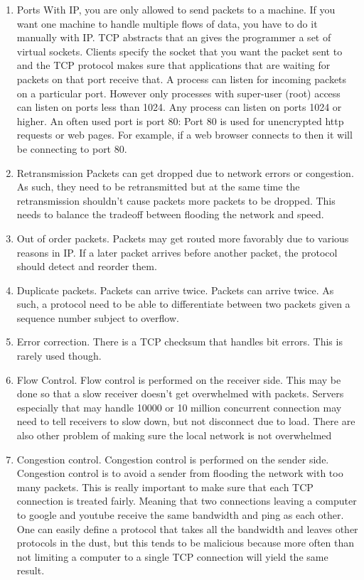 \begin{enumerate}
  \item \gls{Ports}
  With IP, you are only allowed to send packets to a machine.
  If you want one machine to handle multiple flows of data, you have to do it manually with IP.
  TCP abstracts that an gives the programmer a set of virtual sockets.
  Clients specify the socket that you want the packet sent to and the TCP protocol makes sure that applications that are waiting for packets on that port receive that.
  A process can listen for incoming packets on a particular port.
  However only processes with \gls{super-user} (root) access can listen on ports less than 1024.
  Any process can listen on ports 1024 or higher.
  An often used port is port 80: Port 80 is used for unencrypted http requests or web pages.
  For example, if a web browser connects to  then it will be connecting to port 80.

\item \gls{Retransmission}
  Packets can get dropped due to network errors or congestion.
  As such, they need to be retransmitted but at the same time the retransmission shouldn't cause packets more packets to be dropped.
  This needs to balance the tradeoff between flooding the network and speed.

\item Out of order packets.
  Packets may get routed more favorably due to various reasons in IP.
  If a later packet arrives before another packet, the protocol should detect and reorder them.

\item Duplicate packets.
  Packets can arrive twice.
  Packets can arrive twice.
  As such, a protocol need to be able to differentiate between two packets given a sequence number subject to overflow.

\item Error correction.
  There is a TCP checksum that handles bit errors.
  This is rarely used though.

\item Flow Control.
  Flow control is performed on the receiver side.
  This may be done so that a slow receiver doesn't get overwhelmed with packets.
  Servers especially that may handle 10000 or 10 million concurrent connection may need to tell receivers to slow down, but not disconnect due to load.
  There are also other problem of making sure the local network is not overwhelmed

\item Congestion control.
  Congestion control is performed on the sender side.
  Congestion control is to avoid a sender from flooding the network with too many packets.
  This is really important to make sure that each TCP connection is treated fairly.
  Meaning that two connections leaving a computer to google and youtube receive the same bandwidth and ping as each other.
  One can easily define a protocol that takes all the bandwidth and leaves other protocols in the dust, but this tends to be malicious because more often than not limiting a computer to a single TCP connection will yield the same result.


\end{enumerate}
